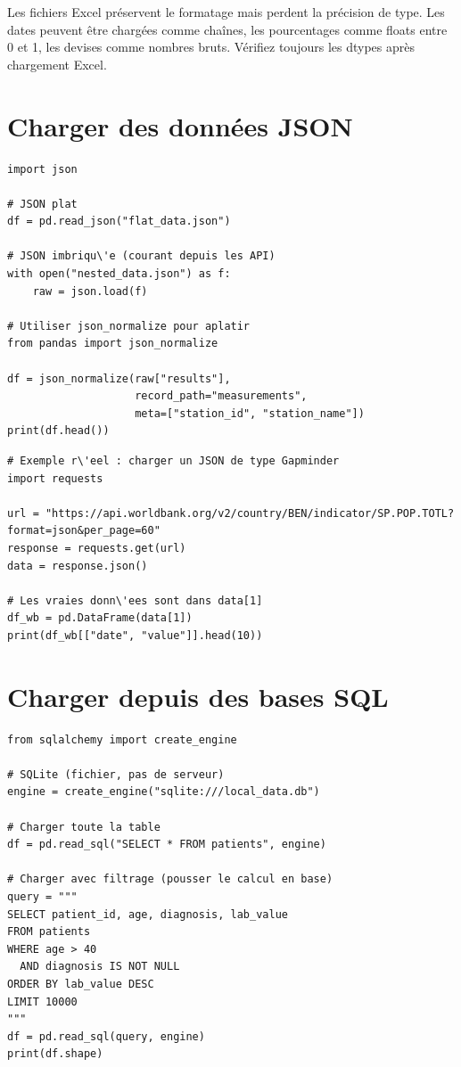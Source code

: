 \begin{datatip}
Les fichiers Excel pr\'eservent le formatage mais perdent la pr\'ecision de type. Les dates peuvent \^etre charg\'ees comme cha\^ines, les pourcentages comme floats entre 0 et 1, les devises comme nombres bruts. V\'erifiez toujours les dtypes apr\`es chargement Excel.
\end{datatip}

\section{Charger des donn\'ees JSON}

\begin{verbatim}
import json

# JSON plat
df = pd.read_json("flat_data.json")

# JSON imbriqu\'e (courant depuis les API)
with open("nested_data.json") as f:
    raw = json.load(f)

# Utiliser json_normalize pour aplatir
from pandas import json_normalize

df = json_normalize(raw["results"],
                    record_path="measurements",
                    meta=["station_id", "station_name"])
print(df.head())
\end{verbatim}

\begin{verbatim}
# Exemple r\'eel : charger un JSON de type Gapminder
import requests

url = "https://api.worldbank.org/v2/country/BEN/indicator/SP.POP.TOTL?format=json&per_page=60"
response = requests.get(url)
data = response.json()

# Les vraies donn\'ees sont dans data[1]
df_wb = pd.DataFrame(data[1])
print(df_wb[["date", "value"]].head(10))
\end{verbatim}

\section{Charger depuis des bases SQL}

\begin{verbatim}
from sqlalchemy import create_engine

# SQLite (fichier, pas de serveur)
engine = create_engine("sqlite:///local_data.db")

# Charger toute la table
df = pd.read_sql("SELECT * FROM patients", engine)

# Charger avec filtrage (pousser le calcul en base)
query = """
SELECT patient_id, age, diagnosis, lab_value
FROM patients
WHERE age > 40
  AND diagnosis IS NOT NULL
ORDER BY lab_value DESC
LIMIT 10000
"""
df = pd.read_sql(query, engine)
print(df.shape)
\end{verbatim}


